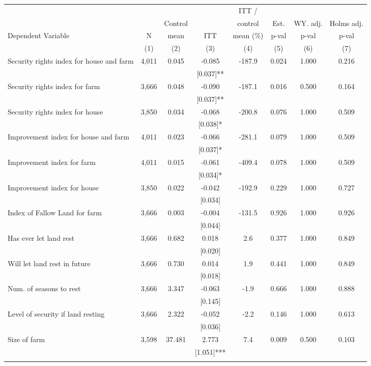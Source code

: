 \begin{tabular}{lccccccc}
\hline \noalign{\smallskip} &  &  &  & ITT / &  &  & \\
 &  & Control &  & control & Est. & WY. adj. & Holms adj.\\
Dependent Variable & N & mean & ITT & mean (\%) & p-val & p-val & p-val\\
 & (1) & (2) & (3) & (4) & (5) & (6) & (7)\\
\noalign{\smallskip}\hline \noalign{\smallskip}Security rights index for house and farm & 4,011 & 0.045 & -0.085 & -187.9 & 0.024 & 1.000 & 0.216\\
 &  &  & [0.037]** &  &  &  & \\
\quad Security rights index for farm & 3,666 & 0.048 & -0.090 & -187.1 & 0.016 & 0.500 & 0.164\\
 &  &  & [0.037]** &  &  &  & \\
\quad Security rights index for house & 3,850 & 0.034 & -0.068 & -200.8 & 0.076 & 1.000 & 0.509\\
 &  &  & [0.038]* &  &  &  & \\
Improvement index for house and farm & 4,011 & 0.023 & -0.066 & -281.1 & 0.079 & 1.000 & 0.509\\
 &  &  & [0.037]* &  &  &  & \\
\quad Improvement index for farm & 4,011 & 0.015 & -0.061 & -409.4 & 0.078 & 1.000 & 0.509\\
 &  &  & [0.034]* &  &  &  & \\
\quad Improvement index for house & 3,850 & 0.022 & -0.042 & -192.9 & 0.229 & 1.000 & 0.727\\
 &  &  & [0.034] &  &  &  & \\
Index of Fallow Land for farm & 3,666 & 0.003 & -0.004 & -131.5 & 0.926 & 1.000 & 0.926\\
 &  &  & [0.044] &  &  &  & \\
\quad Has ever let land rest & 3,666 & 0.682 & 0.018 & 2.6 & 0.377 & 1.000 & 0.849\\
 &  &  & [0.020] &  &  &  & \\
\quad Will let land rest in future & 3,666 & 0.730 & 0.014 & 1.9 & 0.441 & 1.000 & 0.849\\
 &  &  & [0.018] &  &  &  & \\
\quad Num. of seasons to rest & 3,666 & 3.347 & -0.063 & -1.9 & 0.666 & 1.000 & 0.888\\
 &  &  & [0.145] &  &  &  & \\
\quad Level of security if land resting & 3,666 & 2.322 & -0.052 & -2.2 & 0.146 & 1.000 & 0.613\\
 &  &  & [0.036] &  &  &  & \\
Size of farm & 3,598 & 37.481 & 2.773 & 7.4 & 0.009 & 0.500 & 0.103\\
 &  &  & [1.051]*** &  &  &  & \\
\noalign{\smallskip}\hline\end{tabular}
